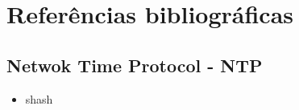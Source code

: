 
\section* {Referências bibliográficas}

\subsection* {Netwok Time Protocol - NTP}
\begin {itemize}
  \item shash
\end{itemize}